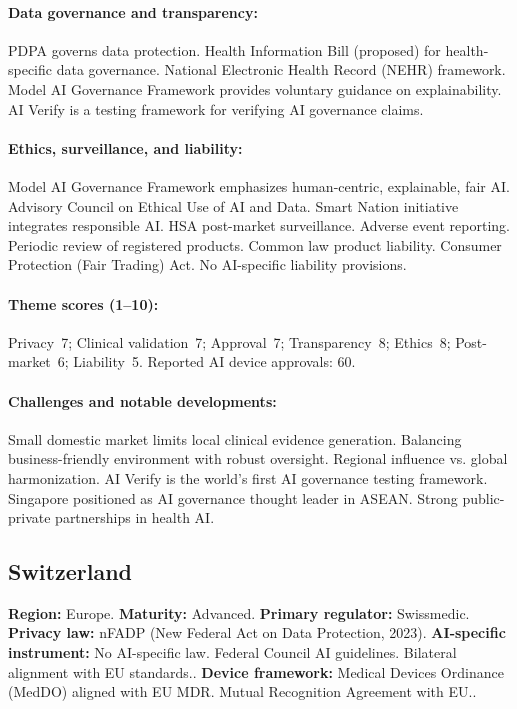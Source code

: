 {\paragraph{Data governance and transparency:}
PDPA governs data protection. Health Information Bill (proposed) for health-specific data governance. National Electronic Health Record (NEHR) framework.
Model AI Governance Framework provides voluntary guidance on explainability. AI Verify is a testing framework for verifying AI governance claims.

\paragraph{Ethics, surveillance, and liability:}
Model AI Governance Framework emphasizes human-centric, explainable, fair AI. Advisory Council on Ethical Use of AI and Data. Smart Nation initiative integrates responsible AI.
HSA post-market surveillance. Adverse event reporting. Periodic review of registered products.
Common law product liability. Consumer Protection (Fair Trading) Act. No AI-specific liability provisions.

\paragraph{Theme scores (1--10):}
Privacy~7;
Clinical validation~7;
Approval~7;
Transparency~8;
Ethics~8;
Post-market~6;
Liability~5.
Reported AI device approvals: 60.

\paragraph{Challenges and notable developments:}
Small domestic market limits local clinical evidence generation. Balancing business-friendly environment with robust oversight. Regional influence vs. global harmonization.
AI Verify is the world's first AI governance testing framework. Singapore positioned as AI governance thought leader in ASEAN. Strong public-private partnerships in health AI.


\subsection{Switzerland}
\textbf{Region:} Europe.
\textbf{Maturity:} Advanced.
\textbf{Primary regulator:} Swissmedic.
\textbf{Privacy law:} nFADP (New Federal Act on Data Protection, 2023).
\textbf{AI-specific instrument:} No AI-specific law. Federal Council AI guidelines. Bilateral alignment with EU standards..
\textbf{Device framework:} Medical Devices Ordinance (MedDO) aligned with EU MDR. Mutual Recognition Agreement with EU..

}
